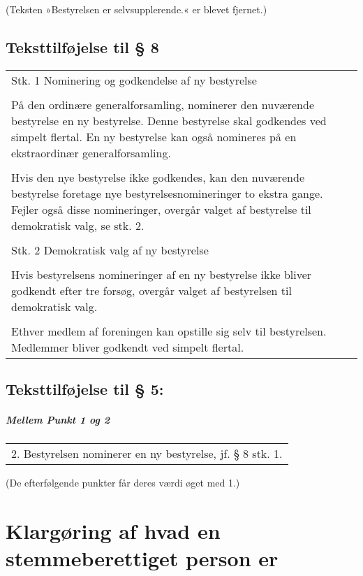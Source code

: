 \documentclass[a4paper,11pt]{report}
\newenvironment{quotationb}%
{\begin{tabular}{|p{10cm}}}%
{\\\end{tabular}}
\begin{document}
\begin{appendices}
\setlength{\parskip}{15pt}
(Teksten »Bestyrelsen er selvsupplerende.« er blevet fjernet.)
\setlength{\parskip}{0pt}

\section*{Teksttilføjelse til § 8}

\begin{quotationb}
Stk. 1 Nominering og godkendelse af ny bestyrelse\\
\\
På den ordinære generalforsamling, nominerer den nuværende bestyrelse en ny
bestyrelse.  Denne bestyrelse skal godkendes ved simpelt flertal.  En ny
bestyrelse kan også nomineres på en ekstraordinær generalforsamling.\\
\\
Hvis den nye bestyrelse ikke godkendes, kan den nuværende bestyrelse foretage
nye bestyrelsesnomineringer to ekstra gange.  Fejler også disse nomineringer,
overgår valget af bestyrelse til demokratisk valg, se stk. 2.\\
\\
Stk. 2 Demokratisk valg af ny bestyrelse\\
\\
Hvis bestyrelsens nomineringer af en ny bestyrelse ikke bliver godkendt efter
tre forsøg, overgår valget af bestyrelsen til demokratisk valg.\\
\\
Ethver medlem af foreningen kan opstille sig selv til bestyrelsen.
Medlemmer bliver godkendt ved simpelt flertal.
\end{quotationb}

\section*{Teksttilføjelse til § 5:}

\paragraph{Mellem Punkt 1 og 2}

\begin{quotationb}
2. Bestyrelsen nominerer en ny bestyrelse, jf. § 8 stk. 1.
\end{quotationb}

\setlength{\parskip}{15pt}
(De efterfølgende punkter får deres værdi øget med 1.)
\setlength{\parskip}{0pt}

\chapter{Klargøring af hvad en stemmeberettiget person er}
\label{app:b4}


\end{appendices}
\end{document}
